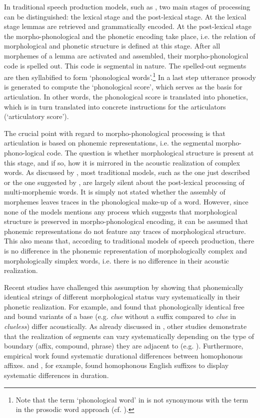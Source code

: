 {In traditional speech production models, such as  \cite{Levelt.1999b}, two main stages of processing can be distinguished: the lexical stage and the post-lexical stage. At the lexical stage lemmas are retrieved and grammatically encoded. At the post-lexical stage the morpho-phonological and the phonetic encoding take place, i.e. the relation of morphological and phonetic structure is defined at this stage. After all morphemes of a lemma are activated and assembled, their morpho-phonological code is spelled out. This code is segmental in nature. The spelled-out segments are then syllabified to form `phonological words'.\footnote{Note that the term `phonological word' in \cite{Levelt.1999b} is not synonymous with the term in the prosodic word approach (cf. ). } In a last step utterance prosody is generated to compute the `phonological score', which serves as the basis for articulation. In other words, the phonological score is translated into phonetics, which is in turn translated into concrete instructions for the articulators (`articulatory score').

The crucial point with regard to morpho-phonological processing is that articulation is based on phonemic representations, i.e. the segmental morpho-phono-logical code. The question is whether morphological structure is present at this stage, and if so, how it is mirrored in the acoustic realization of complex words.
 As discussed by \citet[1037]{CohenGoldberg.2013}, most traditional models, such as the one just described or the one suggested by \cite{Dell.1986}, are largely silent about the post-lexical processing of multi-morphemic words. It is simply not stated whether the assembly of morphemes leaves traces in the phonological make-up of a word. However, since none of the models mentions any process which suggests that morphological structure is preserved in morpho-phonological encoding, it can be assumed that phonemic representations do not feature any traces of morphological structure. This also means that, according to traditional models of speech production, there is no difference in the phonemic representation of morphologically complex and morphologically simplex words, i.e. there is no difference in their acoustic realization.

Recent studies have challenged this assumption by showing that phonemically identical strings of different morphological status vary systematically in their phonetic realization. For example, \cite{Kemps.2005} and \citet{Blazej.2015} found that phonologically identical free and bound variants of a base (e.g. \textit{clue} without a suffix compared to \textit{clue} in \textit{clueless}) differ acoustically.
As already discussed in , other studies demonstrate that the realization of segments can vary systematically depending on the type of boundary (affix, compound, phrase) they are adjacent to  (e.g. \citealt{Sproat.1993b, Smith.2012,LeeKim.2013}). Furthermore, empirical work found systematic durational differences between homophonous affixes. \cite{Plag.2017} and \cite{Godfrey.2016}, for example, found homophonous English suffixes to display systematic differences in duration.
 
}

